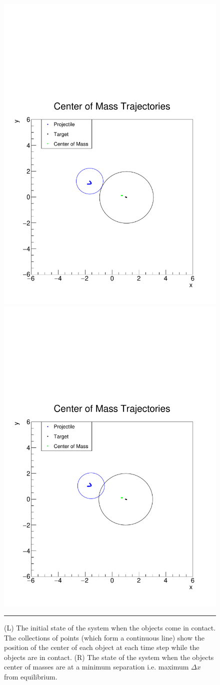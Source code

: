 \documentclass[aps,prl,floatfix,preprint,nofootinbib]{revtex4}
\begin{document}
\begin{figure}[h!]
  \includegraphics[width=.45\textwidth]{plots/default/x_vs_y_with_ellipse.pdf}
  \includegraphics[width=.45\textwidth]{plots/default/x_vs_y_with_ellipse_MS.pdf}
                  {\par\nobreak\rule[9pt]{35em}{0.5pt}\vspace{-5mm}}
                  \caption{(L) The initial state of the system when the objects come in contact. The collections of points (which form a continuous line) show the position of the center of each object at each time step while the objects are in contact. (R) The state of the system when the objects center of masses are at a minimum separation i.e. maximum $\Delta x$ from equilibrium.}
                  \label{fig:tracks_default}
\end{figure}
\end{document}
